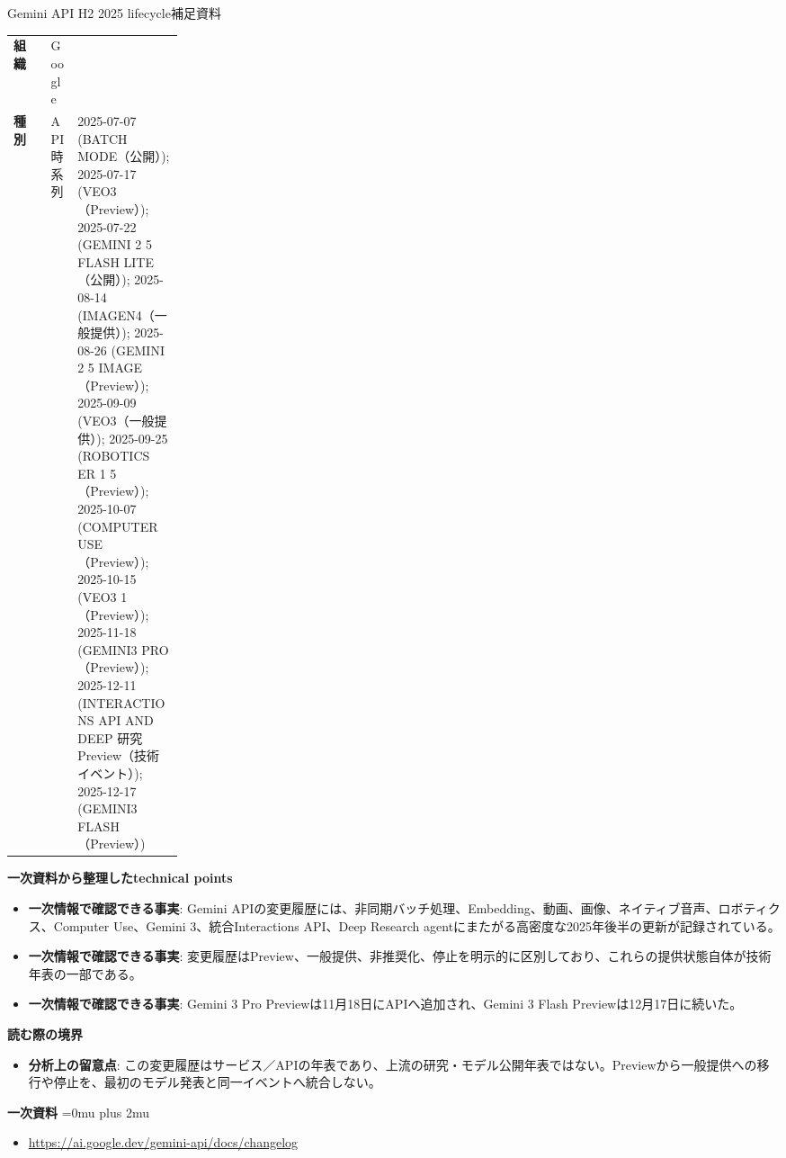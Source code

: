 \begin{technicalnote}{Gemini API H2 2025 lifecycle}{補足資料}
\begingroup
\begin{tabularx}{\linewidth}{@{}>{\bfseries}p{0.22\linewidth}X@{}}
組織 & Google \\
種別 & API
時系列 & 2025-07-07 (BATCH MODE（公開）); 2025-07-17 (VEO3（Preview）); 2025-07-22 (GEMINI 2 5 FLASH LITE（公開）); 2025-08-14 (IMAGEN4（一般提供）); 2025-08-26 (GEMINI 2 5 IMAGE（Preview）); 2025-09-09 (VEO3（一般提供）); 2025-09-25 (ROBOTICS ER 1 5（Preview）); 2025-10-07 (COMPUTER USE（Preview）); 2025-10-15 (VEO3 1（Preview）); 2025-11-18 (GEMINI3 PRO（Preview）); 2025-12-11 (INTERACTIONS API AND DEEP 研究Preview（技術イベント）); 2025-12-17 (GEMINI3 FLASH（Preview）) \\
\end{tabularx}
\smallskip
{\bfseries 一次資料から整理したtechnical points}
\begin{itemize}[leftmargin=1.5em,itemsep=0.35em]
\item \textbf{一次情報で確認できる事実}: Gemini APIの変更履歴には、非同期バッチ処理、Embedding、動画、画像、ネイティブ音声、ロボティクス、Computer Use、Gemini 3、統合Interactions API、Deep Research agentにまたがる高密度な2025年後半の更新が記録されている。
\item \textbf{一次情報で確認できる事実}: 変更履歴はPreview、一般提供、非推奨化、停止を明示的に区別しており、これらの提供状態自体が技術年表の一部である。
\item \textbf{一次情報で確認できる事実}: Gemini 3 Pro Previewは11月18日にAPIへ追加され、Gemini 3 Flash Previewは12月17日に続いた。
\end{itemize}
\begin{minipage}{\linewidth}
{\bfseries 読む際の境界}
\begin{itemize}[leftmargin=1.5em,itemsep=0.35em]
\item \textbf{分析上の留意点}: この変更履歴はサービス／APIの年表であり、上流の研究・モデル公開年表ではない。Previewから一般提供への移行や停止を、最初のモデル発表と同一イベントへ統合しない。
\end{itemize}
\begin{samepage}
{\bfseries 一次資料}
\begingroup\sloppy
\Urlmuskip=0mu plus 2mu\relax
\begin{itemize}[leftmargin=1.5em,itemsep=0.25em]
\item {\scriptsize\url{https://ai.google.dev/gemini-api/docs/changelog}}
\end{itemize}
\endgroup
\end{samepage}
\end{minipage}
\endgroup
\end{technicalnote}
\medskip

